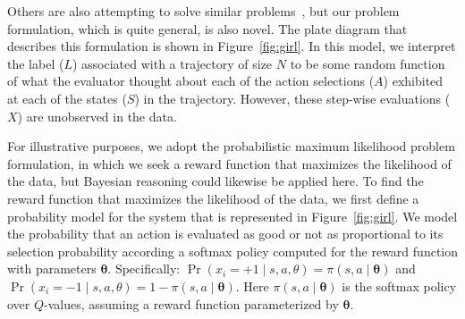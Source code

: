 Others are also attempting to solve similar problems~\cite{burchfiel2016distance,shiarlis2016inverse}, 
but our problem formulation, which is quite general, is also novel.
%
The plate diagram that describes this formulation is shown
in Figure~\ref{fig:girl}.  In this model, we interpret the label ($L$)
associated with a trajectory of size $N$ to be some random function of
what the evaluator thought about each of the action selections ($A$)
exhibited at each of the states ($S$) in the trajectory.  However,
these step-wise evaluations ($X$) are unobserved in the data.

For illustrative purposes, we adopt the probabilistic maximum
likelihood problem formulation, in which we seek a reward function
that maximizes the likelihood of the data, but Bayesian reasoning
could likewise be applied here.
%
To find the reward function that maximizes the likelihood of the data,
we first define a probability model for the system that is represented
in Figure~\ref{fig:girl}.
%
We model the probability that an action is evaluated as good or not as
proportional to its selection probability according a softmax policy
computed for the reward function with parameters
$\bm{\theta}$. Specifically:
%
$\Pr(x_i = +1 \mid s, a, \theta) = \pi(s, a \mid \bm{\theta})$ and
$\Pr(x_i = -1 \mid s, a, \theta) = 1 - \pi(s, a \mid \bm{\theta})$.
%
Here $\pi(s, a \mid \bm{\theta})$ is the softmax policy over $Q$-values,
assuming a reward function parameterized by $\bm{\theta}$.


